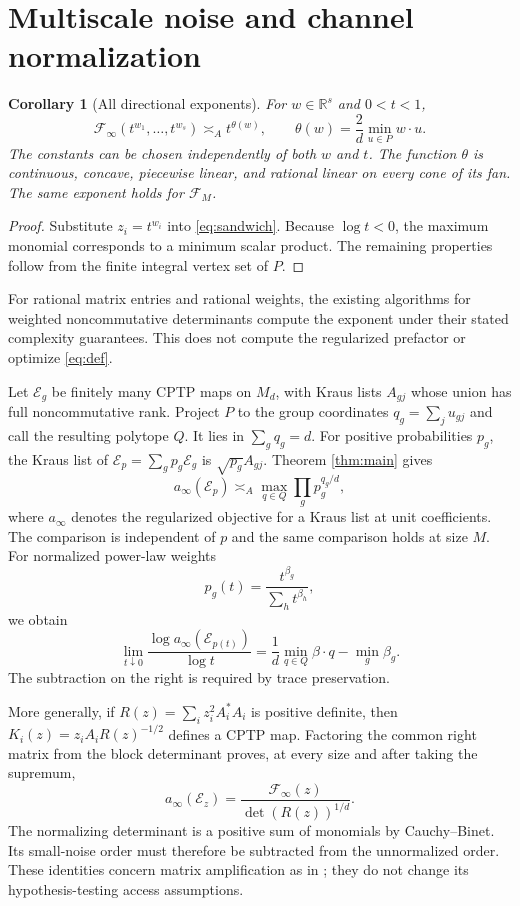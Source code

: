 \documentclass[11pt]{article}
\newtheorem{corollary}[theorem]{Corollary}
\newcommand{\R}{\mathbb R}
\newcommand{\F}{\mathcal F}
\begin{document}
\section{Multiscale noise and channel normalization}
\begin{corollary}[All directional exponents]\label{cor:rates}
For $w\in\R^s$ and $0<t<1$,
\[
 \F_\infty(t^{w_1},\ldots,t^{w_s})\asymp_A t^{\theta(w)},\qquad
 \theta(w)=\frac2d\min_{u\in P}w\cdot u.
\]
The constants can be chosen independently of both $w$ and $t$. The function $\theta$ is continuous, concave, piecewise linear, and rational linear on every cone of its fan. The same exponent holds for $\F_M$.
\end{corollary}
\begin{proof}
Substitute $z_i=t^{w_i}$ into \eqref{eq:sandwich}. Because $\log t<0$, the maximum monomial corresponds to a minimum scalar product. The remaining properties follow from the finite integral vertex set of $P$.
\end{proof}
For rational matrix entries and rational weights, the existing algorithms for weighted noncommutative determinants \cite{hios} compute the exponent under their stated complexity guarantees. This does not compute the regularized prefactor or optimize \eqref{eq:def}.

Let $\mathcal E_g$ be finitely many CPTP maps on $M_d$, with Kraus lists $A_{gj}$ whose union has full noncommutative rank. Project $P$ to the group coordinates $q_g=\sum_j u_{gj}$ and call the resulting polytope $Q$. It lies in $\sum_gq_g=d$. For positive probabilities $p_g$, the Kraus list of $\mathcal E_p=\sum_gp_g\mathcal E_g$ is $\sqrt{p_g}A_{gj}$. Theorem \ref{thm:main} gives
\begin{equation}
 a_\infty(\mathcal E_p)\asymp_A
 \max_{q\in Q}\prod_g p_g^{q_g/d},\label{eq:mixture}
\end{equation}
where $a_\infty$ denotes the regularized objective for a Kraus list at unit coefficients. The comparison is independent of $p$ and the same comparison holds at size $M$.
For normalized power-law weights
\[
 p_g(t)=\frac{t^{\beta_g}}{\sum_h t^{\beta_h}},
\]
we obtain
\begin{equation}
 \lim_{t\downarrow0}\frac{\log a_\infty(\mathcal E_{p(t)})}{\log t}
 =\frac1d\min_{q\in Q}\beta\cdot q-\min_g\beta_g.\label{eq:mixrate}
\end{equation}
The subtraction on the right is required by trace preservation.

More generally, if
$R(z)=\sum_i z_i^2A_i^*A_i$ is positive definite, then
$K_i(z)=z_iA_iR(z)^{-1/2}$ defines a CPTP map. Factoring the common right matrix from the block determinant proves, at every size and after taking the supremum,
\begin{equation}
 a_\infty(\mathcal E_z)=\frac{\F_\infty(z)}{\det(R(z))^{1/d}}.\label{eq:normalization}
\end{equation}
The normalizing determinant is a positive sum of monomials by Cauchy--Binet. Its small-noise order must therefore be subtracted from the unnormalized order. These identities concern matrix amplification as in \cite{tests}; they do not change its hypothesis-testing access assumptions.
\end{document}
